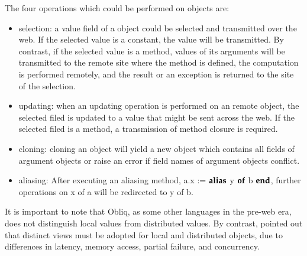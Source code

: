 The four operations which could be performed on objects are:
\begin{itemize}
  \item selection: a value field of a object could be selected and transmitted over the web.  If the selected value is a constant, the value will be transmitted.  By contrast, if the selected value is a method, values of its arguments will be transmitted to the remote site where the method is defined, the computation is performed remotely, and the result or an exception is returned to the site of the selection.
  \item updating: when an updating operation is performed on an remote object, the selected filed is updated to a value that might be sent across the web.  If the selected filed is a method, a transmission of method closure is required.
  \item cloning: cloning an object will yield a new object which contains all fields of argument objects or raise an error if field names of argument objects conflict.
  \item aliasing:  After executing an aliasing method, a.x := $\bf{alias}$ y $\bf{of}$ b $\bf{end}$, further operations on x of a will be redirected to y of b.
\end{itemize}

It is important to note that Obliq, as some other languages in the pre-web era, does not distinguish local values from distributed values.  By contrast, \citet{dis_note} pointed out that distinct views must be adopted for local and distributed objects, due to differences in latency, memory access, partial failure, and concurrency.